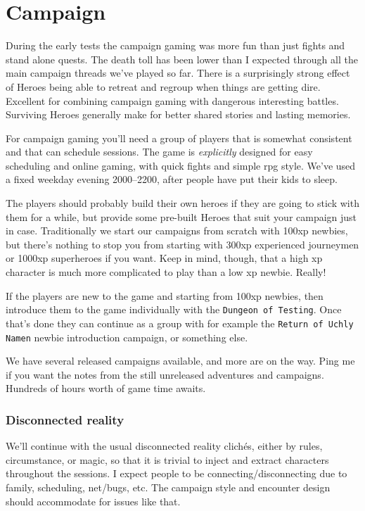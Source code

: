 

\cleardoublepage

\chapter*{Campaign}


During the early tests the campaign gaming was more fun than just fights and stand alone quests. The death toll has been lower than I expected through all the main campaign threads we've played so far. There is a surprisingly strong effect of Heroes being able to retreat and regroup when things are getting dire. Excellent for combining campaign gaming with dangerous interesting battles. Surviving Heroes generally make for better shared stories and lasting memories.

For campaign gaming you'll need a group of players that is somewhat consistent and that can schedule sessions. The game is \emph{explicitly} designed for easy scheduling and online gaming, with quick fights and simple rpg style. We've used a fixed weekday evening 2000--2200, after people have put their kids to sleep.

The players should probably build their own heroes if they are going to stick with them for a while, but provide some pre-built Heroes that suit your campaign just in case. Traditionally we start our campaigns from scratch with 100xp newbies, but there's nothing to stop you from starting with 300xp experienced journeymen or 1000xp superheroes if you want. Keep in mind, though, that a high xp character is much more complicated to play than a low xp newbie. Really!

If the players are new to the game and starting from 100xp newbies, then introduce them to the game individually with the \texttt{Dungeon of Testing}. Once that's done they can continue as a group with for example the \texttt{Return of Uchly Namen} newbie introduction campaign, or something else.

We have several released campaigns available, and more are on the way. Ping me if you want the notes from the still unreleased adventures and campaigns. Hundreds of hours worth of game time awaits.


\subsection*{Disconnected reality}
We'll continue with the usual disconnected reality clichés, either by rules, circumstance, or magic, so that it is trivial to inject and extract characters throughout the sessions. I expect people to be connecting/disconnecting due to family, scheduling, net/bugs, etc. The campaign style and encounter design should accommodate for issues like that.

